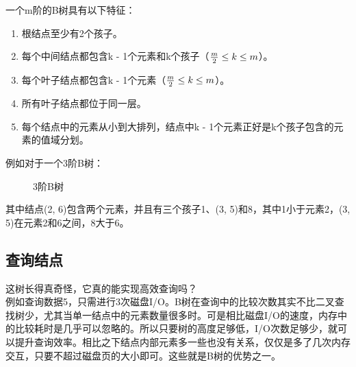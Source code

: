 一个m阶的B树具有以下特征：

\begin{enumerate}
	\item 根结点至少有2个孩子。

	\item 每个中间结点都包含k - 1个元素和k个孩子（$ {m \over 2} \le k \le m $）。

	\item 每个叶子结点都包含k - 1个元素（$ {m \over 2} \le k \le m $）。

	\item 所有叶子结点都位于同一层。

	\item 每个结点中的元素从小到大排列，结点中k - 1个元素正好是k个孩子包含的元素的值域分划。
\end{enumerate}

例如对于一个3阶B树： \\

\begin{figure}[H]
	\centering
	\caption{3阶B树}
\end{figure}

其中结点(2, 6)包含两个元素，并且有三个孩子1、(3, 5)和8，其中1小于元素2，(3, 5)在元素2和6之间，8大于6。

\subsection{查询结点}

这树长得真奇怪，它真的能实现高效查询吗？ \\

例如查询数据5，只需进行3次磁盘I/O。B树在查询中的比较次数其实不比二叉查找树少，尤其当单一结点中的元素数量很多时。可是相比磁盘I/O的速度，内存中的比较耗时是几乎可以忽略的。所以只要树的高度足够低，I/O次数足够少，就可以提升查询效率。相比之下结点内部元素多一些也没有关系，仅仅是多了几次内存交互，只要不超过磁盘页的大小即可。这些就是B树的优势之一。

